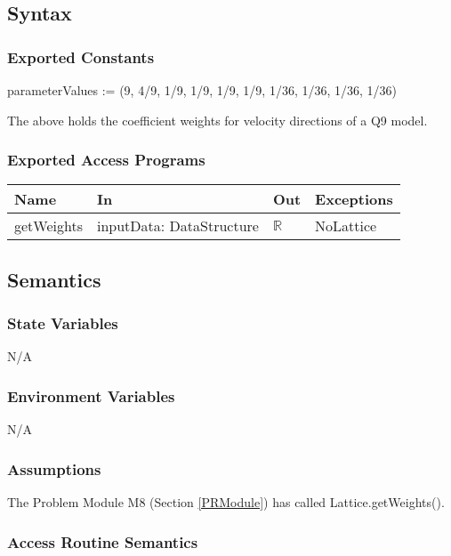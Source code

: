 \documentclass[12pt, titlepage]{article}
\begin{document}
\subsection{Syntax}

\subsubsection{Exported Constants}
parameterValues := (9, 4/9, 1/9, 1/9, 1/9, 1/9, 1/36, 1/36, 1/36, 1/36) 

The above holds the coefficient weights for velocity directions of a Q9 model.

\subsubsection{Exported Access Programs}

\begin{center}
	\begin{tabular}{p{2cm} p{3cm} p{4cm} p{2cm}}
		\hline
		\textbf{Name} & \textbf{In} & \textbf{Out} & \textbf{Exceptions} \\
		\hline
		getWeights & inputData: DataStructure & $\mathbb{R}$ & NoLattice \\
		\hline
	\end{tabular}
\end{center}

\subsection{Semantics}

\subsubsection{State Variables}
N/A

\subsubsection{Environment Variables}
N/A

\subsubsection{Assumptions}

The Problem Module M8 (Section \ref{PRModule}) has called Lattice.getWeights().

\subsubsection{Access Routine Semantics}
\end{document}
